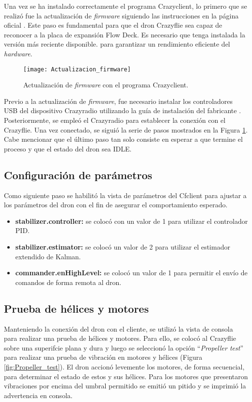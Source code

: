 Una vez se ha instalado correctamente el programa Crazyclient, lo primero que se realizó fue la actualización de \textit{firmware} siguiendo las instrucciones en la página oficial \cite{Crazyflie_6}. Este paso es fundamental para que el dron Crazyflie sea capaz de reconocer a la placa de expansión Flow Deck. Es necesario que tenga instalada la versión más reciente disponible. para garantizar un rendimiento eficiente del \textit{hardware}.

\begin{figure}[htbp]
	\centering
	\texttt{[image: Actualizacion\_firmware]}
	\caption{Actualización de \textit{firmware} con el programa Crazyclient.}
	\label{fig:Actualizacion_firmware}
\end{figure} 

Previo a la actualización de \textit{firmware}, fue necesario instalar los controladores USB del dispositivo Crazyradio utilizando la guía de instalación del fabricante \cite{Crazyflie_USB_driver}. Posteriormente, se empleó el Crazyradio para establecer la conexión con el Crazyflie. Una vez conectado, se siguió la serie de pasos mostrados en la Figura \ref{fig:Actualizacion_firmware}. Cabe mencionar que el último paso tan solo consiste en esperar a que termine el proceso y que el estado del dron sea IDLE. 

\subsection{Configuración de parámetros}
Como siguiente paso se habilitó la vista de parámetros del Cfclient para ajustar a los parámetros del dron con el fin de asegurar el comportamiento esperado.

\begin{itemize}
	\item \textbf{stabilizer.controller:} se colocó con un valor de 1 para utilizar el controlador PID.
	\item \textbf{stabilizer.estimator:} se colocó un valor de 2 para utilizar el estimador extendido de Kalman.
	\item \textbf{commander.enHighLevel:} se colocó un valor de 1 para permitir el envío de comandos de forma remota al dron.
\end{itemize}

\subsection{Prueba de hélices y motores}
Manteniendo la conexión del dron con el cliente, se utilizó la vista de consola para realizar una prueba de hélices y motores. Para ello, se colocó al Crazyflie sobre una superifcie plana y dura y luego se seleccionó la opción ``\textit{Propeller test}'' para realizar una prueba de vibración en motores y hélices (Figura \ref{fig:Propeller_test}). El dron accionó levemente los motores, de forma secuencial, para determinar el estado de estos y sus hélices. Para los motores que presentaron vibraciones por encima del umbral permitido se emitió un pitido y se imprimió la advertencia en consola.

